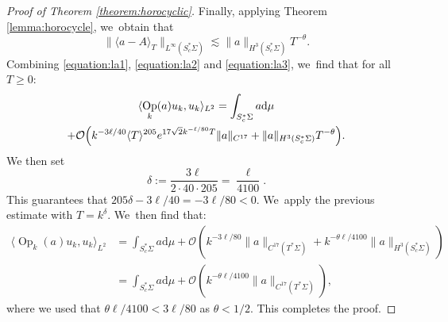 \documentclass[JEP,XML,SOM,Unicode,published]{cedram}
\theoremstyle{plain}
\theoremstyle{definition}
\let\mc\mathcal
\newcommand{\dd}{\mathrm{d}}
\DeclareMathOperator{\Op}{Op}
\begin{document}
\begin{proof}[Proof of Theorem \ref{theorem:horocyclic}]
Finally, applying Theorem \ref{lemma:horocycle}, we~obtain that
\begin{equation}
\label{equation:la3}
\|\langle a-A\rangle_T\|_{L^\infty(S^*_c\Sigma)} \lesssim \|a\|_{H^{3}(S^*_c\Sigma)} T^{-\theta}.
\end{equation}
Combining \eqref{equation:la1}, \eqref{equation:la2} and \eqref{equation:la3}, we~find that for all $T \geq 0$:
\begin{multline*}
\langle \Op_k(a)u_k,u_k\rangle_{L^2}= \int_{S^*_c\Sigma} a \dd \mu \\
+ \mc{O}\Bigl(k^{-3\ell/40} \langle T\rangle^{205} e^{17\sqrt{2}k^{-\ell/80} T} \|a\|_{C^{17}} + \|a\|_{H^{3}(S^*_c\Sigma)} T^{-\theta}\Bigr).
\end{multline*}
We then set
\[
\delta := \dfrac{3 \ell}{2 \cdot 40 \cdot 205} = \dfrac{\ell}{4100}.
\]
This guarantees that $205 \delta-3\ell/40 =-3\ell/80 < 0$. We~apply the previous estimate with $T = k^{\delta}$. We~then find that:
\[
\begin{split}
\langle \Op_k(a)u_k,u_k\rangle_{L^2} &= \int_{S^*_c\Sigma} a \dd \mu + \mc{O}(k^{-3\ell/80} \|a\|_{C^{17}(T^*\Sigma)} + k^{-\theta \ell/4100}\|a\|_{H^3(S^*_c\Sigma)}) \\
& = \int_{S^*_c\Sigma} a \dd \mu + \mc{O}(k^{-\theta \ell/4100}\|a\|_{C^{17}(T^*\Sigma)}),
\end{split}
\]
where we used that $\theta \ell/4100 < 3\ell/80$ as $\theta < 1/2$. This completes the proof.
\end{proof}

\backmatter


\end{document}
